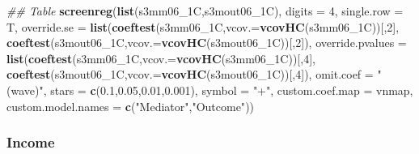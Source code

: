 \documentclass[
]{article}
\newenvironment{Shaded}{\begin{snugshade}}{\end{snugshade}}
\newcommand{\CommentTok}[1]{\textcolor[rgb]{0.56,0.35,0.01}{\textit{#1}}}
\newcommand{\DataTypeTok}[1]{\textcolor[rgb]{0.13,0.29,0.53}{#1}}
\newcommand{\DecValTok}[1]{\textcolor[rgb]{0.00,0.00,0.81}{#1}}
\newcommand{\FloatTok}[1]{\textcolor[rgb]{0.00,0.00,0.81}{#1}}
\newcommand{\KeywordTok}[1]{\textcolor[rgb]{0.13,0.29,0.53}{\textbf{#1}}}
\newcommand{\NormalTok}[1]{#1}
\newcommand{\StringTok}[1]{\textcolor[rgb]{0.31,0.60,0.02}{#1}}
\begin{document}
\begin{Shaded}
\begin{Highlighting}[]
\CommentTok{## Table}
\KeywordTok{screenreg}\NormalTok{(}\KeywordTok{list}\NormalTok{(s3mm06_1C,s3mout06_1C), }\DataTypeTok{digits =} \DecValTok{4}\NormalTok{, }\DataTypeTok{single.row =}\NormalTok{ T,}
          \DataTypeTok{override.se =} \KeywordTok{list}\NormalTok{(}\KeywordTok{coeftest}\NormalTok{(s3mm06_1C,}\DataTypeTok{vcov.=}\KeywordTok{vcovHC}\NormalTok{(s3mm06_1C))[,}\DecValTok{2}\NormalTok{],}
                             \KeywordTok{coeftest}\NormalTok{(s3mout06_1C,}\DataTypeTok{vcov.=}\KeywordTok{vcovHC}\NormalTok{(s3mout06_1C))[,}\DecValTok{2}\NormalTok{]),}
          \DataTypeTok{override.pvalues =} \KeywordTok{list}\NormalTok{(}\KeywordTok{coeftest}\NormalTok{(s3mm06_1C,}\DataTypeTok{vcov.=}\KeywordTok{vcovHC}\NormalTok{(s3mm06_1C))[,}\DecValTok{4}\NormalTok{],}
                                  \KeywordTok{coeftest}\NormalTok{(s3mout06_1C,}\DataTypeTok{vcov.=}\KeywordTok{vcovHC}\NormalTok{(s3mout06_1C))[,}\DecValTok{4}\NormalTok{]),}
          \DataTypeTok{omit.coef =} \StringTok{"(wave)"}\NormalTok{, }\DataTypeTok{stars =} \KeywordTok{c}\NormalTok{(}\FloatTok{0.1}\NormalTok{,}\FloatTok{0.05}\NormalTok{,}\FloatTok{0.01}\NormalTok{,}\FloatTok{0.001}\NormalTok{), }\DataTypeTok{symbol =} \StringTok{"+"}\NormalTok{,}
          \DataTypeTok{custom.coef.map =}\NormalTok{ vnmap, }
          \DataTypeTok{custom.model.names =} \KeywordTok{c}\NormalTok{(}\StringTok{"Mediator"}\NormalTok{,}\StringTok{"Outcome"}\NormalTok{))}
\end{Highlighting}
\end{Shaded}

\hypertarget{income}{%
\subsubsection{Income}\label{income}}
\end{document}
